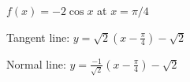 {$f(x)=-2\cos x$ at $x=\pi/4$
}
{Tangent line: $y = \sqrt{2}(x-\frac{\pi}{4})-\sqrt{2}$

Normal line: $y = \frac{-1}{\sqrt{2}}(x-\frac{\pi}{4})-\sqrt{2}$
}
